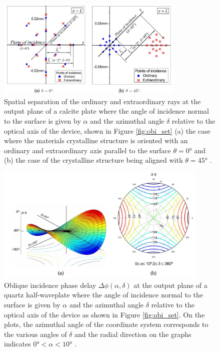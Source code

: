 \documentclass{optica-article}
\begin{document}
\begin{figure}[htp]
  \centering
  \includegraphics[width=0.8\textwidth]{figs/WP_OI.PNG}
  \caption{Spatial separation of the ordinary and extraordinary rays at the 
  output plane of a calcite plate where 
  the  angle of incidence normal to the surface is given by $\alpha$ and the 
  azimuthal angle $\delta$ relative to the optical axis of the device, shown 
  in Figure \ref{fig:obi_set} (a) the case where the materials crystalline
  structure is oriented with an ordinary and extraordinary axis parallel to the
  surface $\theta=\ang{0}$
  and (b) the case of the crystalline structure being aligned with 
  $\theta=\ang{45}$ \cite{OBI_phase}.}
  \label{fig:obi}
\end{figure}

\begin{figure}[htp]
  \centering
  \includegraphics[width=0.9\textwidth]{figs/PhaseDelay.PNG}
  \caption{Oblique incidence phase delay $\Delta \phi (\alpha,\delta)$ 
  at the output plane of a quartz half-waveplate
  where the
  angle of incidence normal to the surface is given by $\alpha$ and the 
  azimuthal angle $\delta$ relative to the optical axis of the device as shown 
  in Figure \ref{fig:obi_set}. On the plots, the azimuthal angle of the
  coordinate system corresponds to the various angles of $\delta$ and the radial
  direction on the graphs indicates $\ang{0} < \alpha < \ang{10}$
   \cite{OBI_phase}.}
  \label{fig:obi_phase}
\end{figure}
\end{document}
